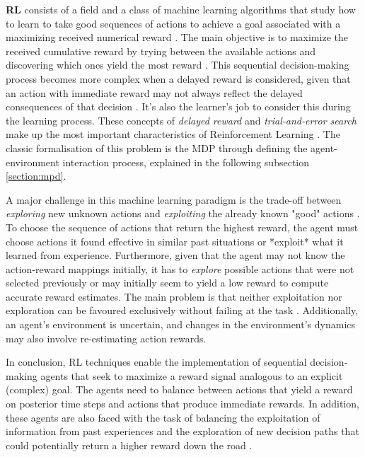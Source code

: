 \documentclass[11pt,a4paper]{article}
\begin{document}
\textbf{\ac{RL}} consists of a field and a class of machine learning algorithms that study how to learn to take good sequences of actions to achieve a goal associated with a maximizing received numerical reward \cite{brunskillCS234ReinforcementLearning}. The main objective is to maximize the received cumulative reward by trying between the available actions and discovering which ones yield the most reward \cite{suttonReinforcementLearningIntroduction2014}. This sequential decision-making process becomes more complex when a delayed reward is considered, given that an action with immediate reward may not always reflect the delayed consequences of that decision \cite{suttonReinforcementLearningIntroduction2014}. It's also the learner's job to consider this during the learning process. These concepts of \textit{delayed reward} and \textit{trial-and-error search} make up the most important characteristics of Reinforcement Learning \cite{suttonReinforcementLearningIntroduction2014}. The classic formalisation of this problem is the \ac{MDP} through defining the agent-environment interaction process, explained in the following subsection \ref{section:mpd}. \par 

A major challenge in this machine learning paradigm is the trade-off between \textit{exploring} new unknown actions and \textit{exploiting} the already known "good" actions \cite{suttonReinforcementLearningIntroduction2014}. To choose the sequence of actions that return the highest reward, the agent must choose actions it found effective in similar past situations or *exploit* what it learned from experience. Furthermore, given that the agent may not know the action-reward mappings initially, it has to \textit{explore} possible actions that were not selected previously or may initially seem to yield a low reward to compute accurate reward estimates. The main problem is that neither exploitation nor exploration can be favoured exclusively without failing at the task \cite{suttonReinforcementLearningIntroduction2014}. Additionally, an agent's environment is uncertain, and changes in the environment's dynamics may also involve re-estimating action rewards. \par


In conclusion, \ac{RL} techniques enable the implementation of sequential decision-making agents that seek to maximize a reward signal analogous to an explicit (complex) goal. The agents need to balance between actions that yield a reward on posterior time steps and actions that produce immediate rewards. In addition, these agents are also faced with the task of balancing the exploitation of information from past experiences and the exploration of new decision paths that could potentially return a higher reward down the road \cite{suttonReinforcementLearningIntroduction2014}.  \par
\end{document}
